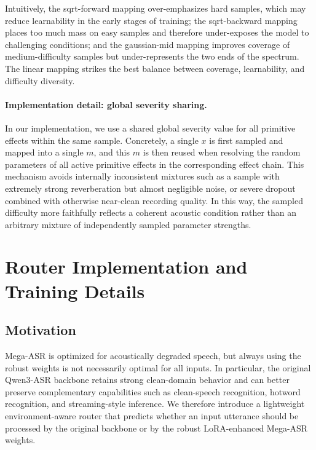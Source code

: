 \documentclass{llmxive}
\begin{document}
Intuitively, the sqrt-forward mapping over-emphasizes hard samples, which may
reduce learnability in the early stages of training; the sqrt-backward mapping
places too much mass on easy samples and therefore under-exposes the model to
challenging conditions; and the gaussian-mid mapping improves coverage of
medium-difficulty samples but under-represents the two ends of the spectrum.
The linear mapping strikes the best balance between coverage, learnability, and
difficulty diversity.



\paragraph{Implementation detail: global severity sharing.}
In our implementation, we use a shared global severity value for all primitive
effects within the same sample. Concretely, a single $x$ is first sampled and
mapped into a single $m$, and this $m$ is then reused when resolving the random
parameters of all active primitive effects in the corresponding effect chain.
This mechanism avoids internally inconsistent mixtures such as a sample with
extremely strong reverberation but almost negligible noise, or severe dropout
combined with otherwise near-clean recording quality. In this way, the sampled
difficulty more faithfully reflects a coherent acoustic condition rather than an
arbitrary mixture of independently sampled parameter strengths.


\section{Router Implementation and Training Details}

\subsection{Motivation}

Mega-ASR is optimized for acoustically degraded speech, but always using the
robust weights is not necessarily optimal for all inputs. In particular, the
original Qwen3-ASR backbone retains strong clean-domain behavior and can better
preserve complementary capabilities such as clean-speech recognition, hotword
recognition, and streaming-style inference. We therefore introduce a lightweight
environment-aware router that predicts whether an input utterance should be
processed by the original backbone or by the robust LoRA-enhanced Mega-ASR
weights.
\end{document}
